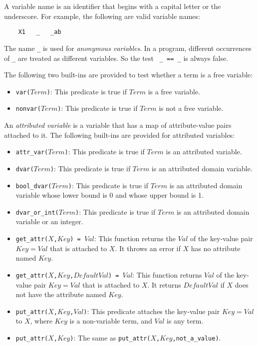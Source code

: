 A variable name is an identifier that begins with a capital letter or the underscore. For example, the following are valid variable names:
\begin{verbatim}
    X1   _   _ab
\end{verbatim}
The name \verb+_+ is used for \emph{anonymous variables}. In a program, different occurrences of \verb+_+ are treated as different variables. So the test \verb+ _ == _+ is always false.

The following two built-ins are provided to test whether a term is a free variable:
\begin{itemize}
\item \texttt{var($Term$)}: This predicate is true if $Term$ is a free variable.
\item \texttt{nonvar($Term$)}: This predicate is true if $Term$ is not a free variable.
\end{itemize}

An \emph{attributed variable} is a variable that has a map of attribute-value pairs attached to it. The following built-ins are provided for attributed variables:

\begin{itemize}
\item \texttt{attr\_var($Term$)}: This predicate is true if $Term$ is an attributed variable.
\item \texttt{dvar($Term$)}: This predicate is true if $Term$ is an attributed domain variable.
\item \texttt{bool\_dvar($Term$)}: This predicate is true if $Term$ is an attributed domain variable whose lower bound is 0 and whose upper bound is 1.
\item \texttt{dvar\_or\_int($Term$)}: This predicate is true if $Term$ is an attributed domain variable or an integer.
\item \texttt{get\_attr($X$,$Key$) = $Val$}: This function returns the \texttt{$Val$} of the key-value pair \texttt{$Key$$=$$Val$} that is attached to \texttt{$X$}. It throws an error if \texttt{$X$} has no attribute named $Key$.
\item \texttt{get\_attr($X$,$Key$,$DefaultVal$) = $Val$}: This function returns \texttt{$Val$} of the key-value pair \texttt{$Key$$=$$Val$} that is attached to \texttt{$X$}. It returns $DefaultVal$ if $X$ does not have the attribute named $Key$.
\item \texttt{put\_attr($X$,$Key$,$Val$)}: This predicate attaches the key-value pair \texttt{$Key$$=$$Val$} to \texttt{$X$}, where \texttt{$Key$} is a non-variable term, and \texttt{$Val$} is any term. 
\item \texttt{put\_attr($X$,$Key$)}: The same as \texttt{put\_attr($X$,$Key$,not\_a\_value)}.
\end{itemize}

